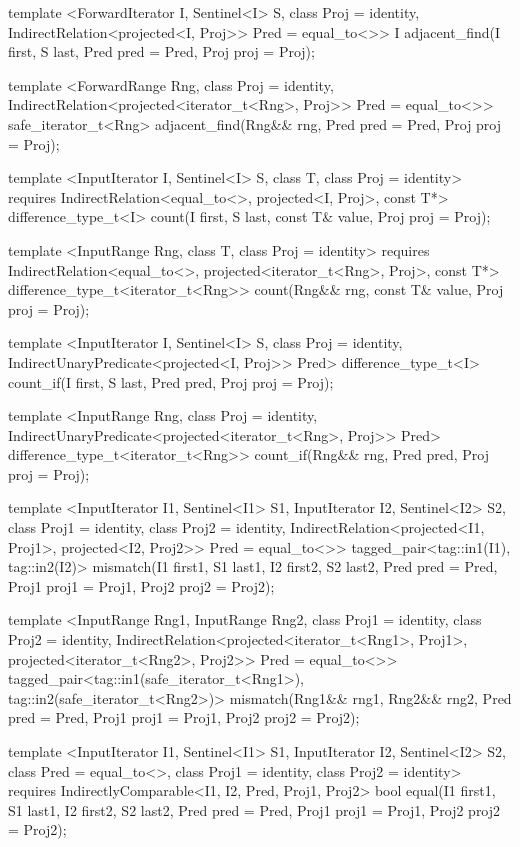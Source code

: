 \begin{codeblock}
{{{{  template <ForwardIterator I, Sentinel<I> S, class Proj = identity,
      IndirectRelation<projected<I, Proj>> Pred = equal_to<>>
    I
      adjacent_find(I first, S last, Pred pred = Pred{},
                    Proj proj = Proj{});

  template <ForwardRange Rng, class Proj = identity,
      IndirectRelation<projected<iterator_t<Rng>, Proj>> Pred = equal_to<>>
    safe_iterator_t<Rng>
      adjacent_find(Rng&& rng, Pred pred = Pred{}, Proj proj = Proj{});

  template <InputIterator I, Sentinel<I> S, class T, class Proj = identity>
    requires IndirectRelation<equal_to<>, projected<I, Proj>, const T*>
    difference_type_t<I>
      count(I first, S last, const T& value, Proj proj = Proj{});

  template <InputRange Rng, class T, class Proj = identity>
    requires IndirectRelation<equal_to<>, projected<iterator_t<Rng>, Proj>, const T*>
    difference_type_t<iterator_t<Rng>>
      count(Rng&& rng, const T& value, Proj proj = Proj{});

  template <InputIterator I, Sentinel<I> S, class Proj = identity,
      IndirectUnaryPredicate<projected<I, Proj>> Pred>
    difference_type_t<I>
      count_if(I first, S last, Pred pred, Proj proj = Proj{});

  template <InputRange Rng, class Proj = identity,
      IndirectUnaryPredicate<projected<iterator_t<Rng>, Proj>> Pred>
    difference_type_t<iterator_t<Rng>>
      count_if(Rng&& rng, Pred pred, Proj proj = Proj{});

  template <InputIterator I1, Sentinel<I1> S1, InputIterator I2, Sentinel<I2> S2,
      class Proj1 = identity, class Proj2 = identity,
      IndirectRelation<projected<I1, Proj1>, projected<I2, Proj2>> Pred = equal_to<>>
    tagged_pair<tag::in1(I1), tag::in2(I2)>
      mismatch(I1 first1, S1 last1, I2 first2, S2 last2, Pred pred = Pred{},
               Proj1 proj1 = Proj1{}, Proj2 proj2 = Proj2{});

  template <InputRange Rng1, InputRange Rng2,
      class Proj1 = identity, class Proj2 = identity,
      IndirectRelation<projected<iterator_t<Rng1>, Proj1>,
        projected<iterator_t<Rng2>, Proj2>> Pred = equal_to<>>
    tagged_pair<tag::in1(safe_iterator_t<Rng1>),
                tag::in2(safe_iterator_t<Rng2>)>
      mismatch(Rng1&& rng1, Rng2&& rng2, Pred pred = Pred{},
               Proj1 proj1 = Proj1{}, Proj2 proj2 = Proj2{});

  template <InputIterator I1, Sentinel<I1> S1, InputIterator I2, Sentinel<I2> S2,
      class Pred = equal_to<>, class Proj1 = identity, class Proj2 = identity>
    requires IndirectlyComparable<I1, I2, Pred, Proj1, Proj2>
    bool equal(I1 first1, S1 last1, I2 first2, S2 last2,
               Pred pred = Pred{},
               Proj1 proj1 = Proj1{}, Proj2 proj2 = Proj2{});

}}}}
\end{codeblock}
